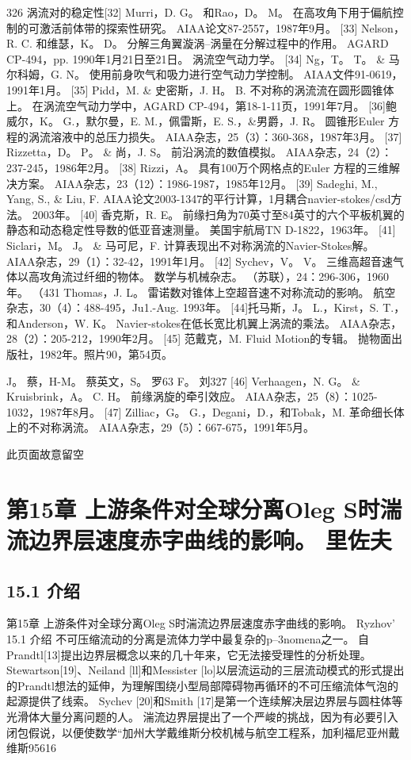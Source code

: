 \documentclass[UTF8,11pt,a4paper,openany,fontset=fandol]{ctexbook}
\begin{document}
326 涡流对的稳定性[32] Murri，D. G。 和Rao，D。 M。 在高攻角下用于偏航控制的可激活前体带的探索性研究。 AIAA论文87-2557，1987年9月。 [33] Nelson，R. C. 和维瑟，K。 D。 分解三角翼漩涡--涡量在分解过程中的作用。 AGARD CP-494，pp. 1990年1月21日至21日。 涡流空气动力学。 [34] Ng，T。 T。 \& 马尔科姆，G. N。 使用前身吹气和吸力进行空气动力学控制。 AIAA文件91-0619，1991年1月。 [35] Pidd，M. \& 史密斯，J. H。 B. 不对称的涡流流在圆形圆锥体上。 在涡流空气动力学中，AGARD CP-494，第18-1-11页，1991年7月。 [36]鲍威尔，K。 G.，默尔曼，E. M.，佩雷斯，E. S.，\&男爵，J. R。 圆锥形Euler 方程的涡流溶液中的总压力损失。 AIAA杂志，25（3）：360-368，1987年3月。 [37] Rizzetta，D。 P。 \& 尚，J. S。 前沿涡流的数值模拟。 AIAA杂志，24（2）：237-245，1986年2月。 [38] Rizzi，A。 具有100万个网格点的Euler 方程的三维解决方案。 AIAA杂志，23（12）：1986-1987，1985年12月。 [39] Sadeghi, M., Yang, S., \& Liu, F. AIAA论文2003-1347的平行计算，1月耦合navier-stokes/csd方法。 2003年。 [40] 香克斯，R. E。 前缘扫角为70英寸至84英寸的六个平板机翼的静态和动态稳定性导数的低亚音速测量。 美国宇航局TN D-1822，1963年。 [41] Siclari，M。 J。 \& 马可尼，F. 计算表现出不对称涡流的Navier-Stokes解。 AIAA杂志，29（1）：32-42，1991年1月。 [42] Sychev，V。 V。 三维高超音速气体以高攻角流过纤细的物体。 数学与机械杂志。 （苏联），24：296-306，1960年。 （431 Thomas，J. L。 雷诺数对锥体上空超音速不对称流动的影响。 航空杂志，30（4）：488-495，Ju1.-Aug. 1993年。 [44]托马斯，J。 L.，Kirst，S. T.，和Anderson，W. K。 Navier-stokes在低长宽比机翼上涡流的乘法。 AIAA杂志，28（2）：205-212，1990年2月。 [45] 范戴克，M. Fluid Motion的专辑。 抛物面出版社，1982年。照片90，第54页。

J。 蔡，H-M。 蔡英文，S。 罗63 F。 刘327 [46] Verhaagen，N. G。 \& Kruisbrink，A。 C. H。 前缘涡旋的牵引效应。 AIAA杂志，25（8）：1025-1032，1987年8月。 [47] Zilliac，G。 G.，Degani，D.，和Tobak，M. 革命细长体上的不对称涡流。 AIAA杂志，29（5）：667-675，1991年5月。

此页面故意留空

\clearpage
\chapter{第15章 上游条件对全球分离Oleg S时湍流边界层速度赤字曲线的影响。 里佐夫}
\section{15.1 介绍}
第15章 上游条件对全球分离Oleg S时湍流边界层速度赤字曲线的影响。 Ryzhov' 15.1 介绍 不可压缩流动的分离是流体力学中最复杂的p--3nomena之一。 自Prandtl[13]提出边界层概念以来的几十年来，它无法接受理性的分析处理。 Stewartson[19]、Neiland [ll]和Messister [lo]以层流运动的三层流动模式的形式提出的Prandtl想法的延伸，为理解围绕小型局部障碍物再循环的不可压缩流体气泡的起源提供了线索。 Sychev [20]和Smith [17]是第一个连续解决层边界层与圆柱体等光滑体大量分离问题的人。 湍流边界层提出了一个严峻的挑战，因为有必要引入闭包假说，以便使数学“加州大学戴维斯分校机械与航空工程系，加利福尼亚州戴维斯95616
\end{document}
